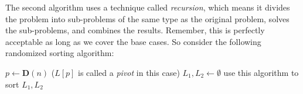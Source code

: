 \documentclass[12pt]{article}
\theoremstyle{plain}
\theoremstyle{definition}
\theoremstyle{remark}
\begin{document}
The second algorithm uses a technique called \emph{recursion}, which means it divides the problem into sub-problems of the same type as the original problem, solves the sub-problems, and combines the results. Remember, this is perfectly acceptable as long as we cover the base cases. So consider the following randomized sorting algorithm:

\begin{algorithm}
\DontPrintSemicolon
{}
$p\gets\textbf{D}(n)$ ($L[p]$ is called a \emph{pivot} in this case)\;
$L_1,L_2\gets\emptyset$\;
use this algorithm to sort $L_1,L_2$\;
\Return{$[L_1,L[p],L_2]$}\;
\end{algorithm}
\end{document}
